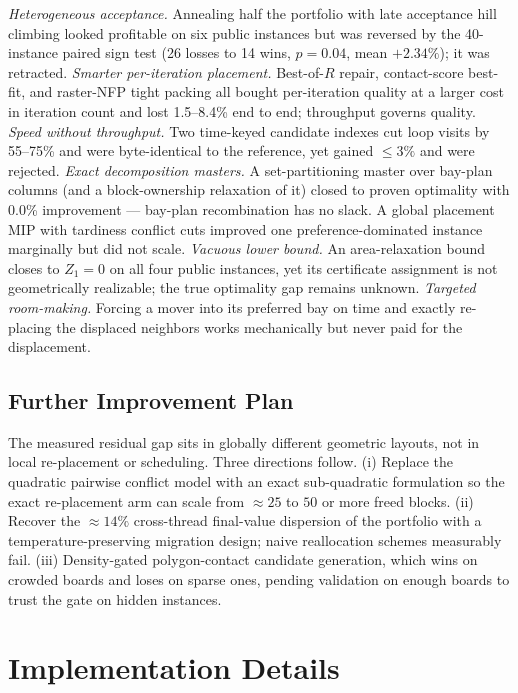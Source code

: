 \documentclass[runningheads]{llncs}
\begin{document}
\emph{Heterogeneous acceptance.} Annealing half the portfolio with late
acceptance hill climbing looked profitable on six public instances but was
reversed by the 40-instance paired sign test (26 losses to 14 wins,
$p = 0.04$, mean $+2.34\%$); it was retracted. \emph{Smarter per-iteration
placement.} Best-of-$R$ repair, contact-score best-fit, and raster-NFP
tight packing all bought per-iteration quality at a larger cost in iteration
count and lost 1.5--8.4\% end to end; throughput governs quality.
\emph{Speed without throughput.} Two time-keyed candidate indexes cut loop
visits by 55--75\% and were byte-identical to the reference, yet gained
$\le 3\%$ and were rejected. \emph{Exact decomposition masters.} A
set-partitioning master over bay-plan columns (and a block-ownership
relaxation of it) closed to proven optimality with 0.0\% improvement ---
bay-plan recombination has no slack. A global placement MIP with tardiness
conflict cuts improved one preference-dominated instance marginally but did
not scale. \emph{Vacuous lower bound.} An area-relaxation bound closes to
$Z_1 = 0$ on all four public instances, yet its certificate assignment is not
geometrically realizable; the true optimality gap remains unknown.
\emph{Targeted room-making.} Forcing a mover into its preferred bay on time
and exactly re-placing the displaced neighbors works mechanically but never
paid for the displacement.

\subsection{Further Improvement Plan}

The measured residual gap sits in globally different geometric layouts, not
in local re-placement or scheduling. Three directions follow. (i) Replace the
quadratic pairwise conflict model with an exact sub-quadratic formulation so
the exact re-placement arm can scale from $\approx 25$ to $50$ or more
freed blocks. (ii) Recover the $\approx 14\%$ cross-thread final-value
dispersion of the portfolio with a temperature-preserving migration design;
naive reallocation schemes measurably fail. (iii) Density-gated
polygon-contact candidate generation, which wins on crowded boards and loses
on sparse ones, pending validation on enough boards to trust the gate on
hidden instances.

\section{Implementation Details}
\label{sec:implementation}
\end{document}
